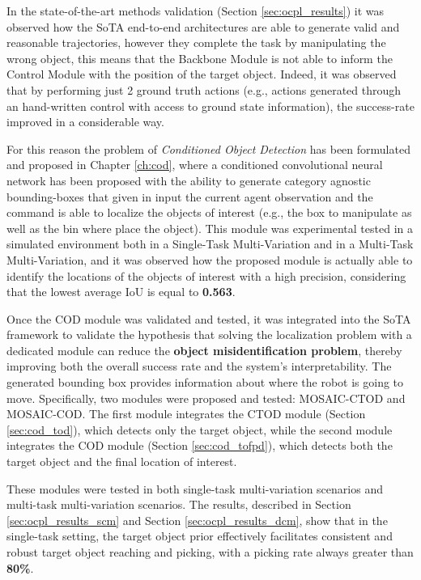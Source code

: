 In the state-of-the-art methods validation (Section \ref{sec:ocpl_results}) it was observed how the SoTA end-to-end architectures are able to generate valid and reasonable trajectories, however they complete the task by manipulating the wrong object, this means that the Backbone Module is not able to inform the Control Module with the position of the target object. Indeed, it was observed that by performing just 2 ground truth actions (e.g., actions generated through an hand-written control with access to ground state information), the success-rate improved in a considerable way.

For this reason the problem of \textit{Conditioned Object Detection} has been formulated and proposed in Chapter \ref{ch:cod}, where a conditioned convolutional neural network has been proposed with the ability to generate category agnostic bounding-boxes that given in input the current agent observation and the command is able to localize the objects of interest (e.g., the box to manipulate as well as the bin where place the object). This module was experimental tested in a simulated environment both in a Single-Task Multi-Variation and in a Multi-Task Multi-Variation, and it was observed how the proposed module is actually able to identify the locations of the objects of interest with a high precision, considering that the lowest average IoU is equal to \textbf{0.563}. 

Once the COD module was validated and tested, it was integrated into the SoTA framework to validate the hypothesis that solving the localization problem with a dedicated module can reduce the \textbf{object misidentification problem}, thereby improving both the overall success rate and the system's interpretability. The generated bounding box provides information about where the robot is going to move. Specifically, two modules were proposed and tested: MOSAIC-CTOD and MOSAIC-COD. The first module integrates the CTOD module (Section \ref{sec:cod_tod}), which detects only the target object, while the second module integrates the COD module (Section \ref{sec:cod_tofpd}), which detects both the target object and the final location of interest.

These modules were tested in both single-task multi-variation scenarios and multi-task multi-variation scenarios. The results, described in Section \ref{sec:ocpl_results_scm} and Section \ref{sec:ocpl_results_dcm}, show that in the single-task setting, the target object prior effectively facilitates consistent and robust target object reaching and picking, with a picking rate always greater than \textbf{80\%}. 

